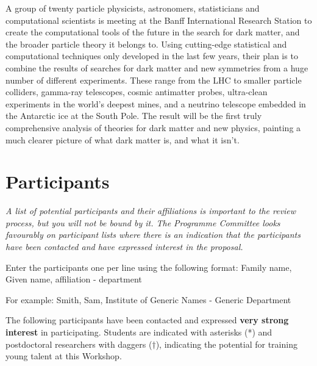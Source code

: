 \documentclass[a4paper,11pt]{article}
\newenvironment{xcomment}{\em}{}
\begin{document}
A group of twenty particle physicists, astronomers, statisticians and computational scientists is meeting at the Banff International Research Station to create the computational tools of the future in the search for dark matter, and the broader particle theory it belongs to.  Using cutting-edge statistical and computational techniques only developed in the last few years, their plan is to combine the results of searches for dark matter and new symmetries from a huge number of different experiments. These range from the LHC to smaller particle colliders, gamma-ray telescopes, cosmic antimatter probes, ultra-clean experiments in the world's deepest mines, and a neutrino telescope embedded in the Antarctic ice at the South Pole. The result will be the first truly comprehensive analysis of theories for dark matter and new physics, painting a much clearer picture of what dark matter is, and what it isn't.

\section{Participants}
\begin{xcomment}
A list of potential participants and their affiliations is important to the review process, but you will not be bound by it. The Programme Committee looks favourably on participant lists where there is an indication that the participants have been contacted and have expressed interest in the proposal.

Enter the participants one per line using the following format:
Family name, Given name, affiliation - department

For example:
Smith, Sam, Institute of Generic Names - Generic Department 
\end{xcomment}

The following participants have been contacted and expressed \textbf{very strong interest} in participating.  Students are indicated with asterisks (*) and postdoctoral researchers with daggers ($\dagger$), indicating the potential for training young talent at this Workshop.
\end{document}
